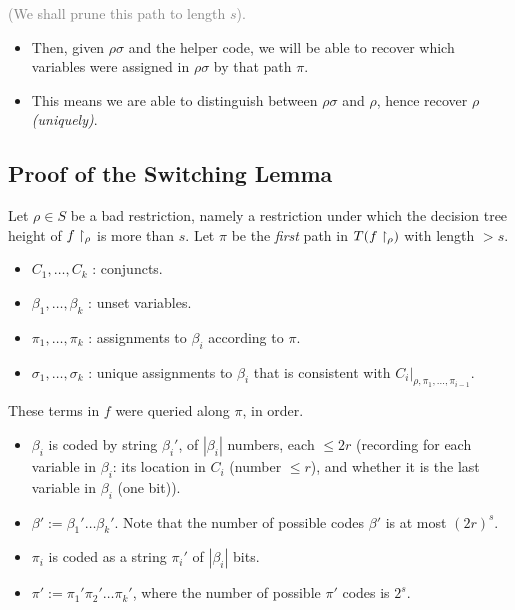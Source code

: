 \begin{tcolorbox}[colframe=white, colback=blue!4, boxrule=0mm, sharp corners]
\begin{itemize}
    \textcolor{gray}{(We shall prune this path to length \( s \)).}
\end{itemize}

\begin{itemize}
    \item Then, given \( \rho\sigma \) and the helper code, we will be able to recover which variables were assigned in \( \rho\sigma \) by that path \( \pi \).
    
    \item This means we are able to distinguish between \( \rho\sigma \) and \( \rho \), hence recover \( \rho \) \emph{(uniquely)}.
\end{itemize}
\end{tcolorbox}

\subsection{Proof of the Switching Lemma}
 
Let \( \rho \in S \) be a bad restriction, namely a restriction under which the decision tree height of $f\upharpoonright_\rho$ is more than $s$.  
Let \( \pi \) be the \emph{first} path in \( T(f\upharpoonright_{\rho}) \) with length \( > s \).

\begin{itemize}
    \item \( C_1, \dots, C_k \) : conjuncts.
    \item \( \beta_1, \dots, \beta_k \) : unset variables.
    \item \( \pi_1, \dots, \pi_k \) : assignments to \( \beta_i \) according to \( \pi \).
    \item \( \sigma_1, \dots, \sigma_k \) : unique assignments to \( \beta_i \) that is consistent with \( C_i |_{\rho, \pi_1, \dots, \pi_{i-1}} \).
\end{itemize}
These terms in \( f \) were queried along \( \pi \), in order.

\begin{itemize}
    \item \( \beta_i \) is coded by string \( \beta_i' \), of \( |\beta_i| \) numbers, each \( \leq 2r \) (recording for each variable in \( \beta_i \): its location in \( C_i \) (number \( \leq r \)), and whether it is the last variable in \( \beta_i \) (one bit)).
    \item \( \beta' := \beta_1' \dots \beta_k' \). Note that the number of possible codes $\beta'$ is at most $ (2r)^s $.
    \item \( \pi_i \) is coded as a string \( \pi_i' \) of \( |\beta_i| \) bits.
    \item \( \pi' := \pi_1' \pi_2' \dots \pi_k' \), where the number of possible \( \pi' \) codes is \( 2^s \).
\end{itemize}


